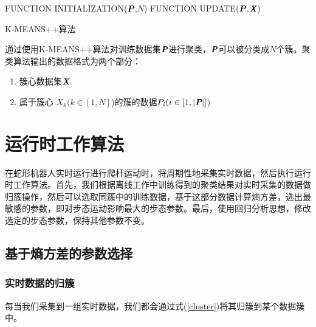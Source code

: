 \begin{algorithm}[h]
	FUNCTION INITIALIZATION($\textit{\textbf{P}}$,$N$) 
	FUNCTION UPDATE($\textit{\textbf{P}}$,$\textit{\textbf{X}}$) 
	
	\caption{K-MEANS++算法}
	\label{KMEANS++}
\end{algorithm}

通过使用K-MEANS++算法对训练数据集$\textit{\textbf{P}}$进行聚类，$\textit{\textbf{P}}$可以被分类成$N$个簇。聚类算法输出的数据格式为两个部分：
\begin{enumerate}
	\item 簇心数据集$\textit{\textbf{X}}$.
	\item 属于簇心 $X_{k}(k \in [1,N]$)的簇的数据$P_{i}(i \in [1,\vert \textit{\textbf{P}} \vert]$)
\end{enumerate}

\section{运行时工作算法}

在蛇形机器人实时运行进行爬杆运动时，将周期性地采集实时数据，然后执行运行时工作算法。首先，我们根据离线工作中训练得到的聚类结果对实时采集的数据做归簇操作，然后可以选取同簇中的训练数据，基于这部分数据计算熵方差，选出最敏感的参数，即对步态运动影响最大的步态参数。最后，使用回归分析思想，修改选定的步态参数，保持其他参数不变。

\subsection{基于熵方差的参数选择}
\subsubsection{实时数据的归簇}
每当我们采集到一组实时数据，我们都会通过式(\ref{cluster})将其归簇到某个数据簇中。

